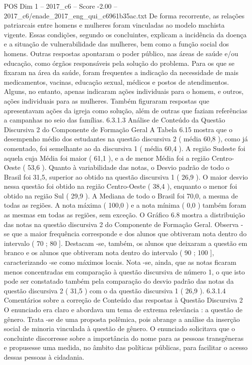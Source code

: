 \begin{textsample}{POS Dim 1 – 2017\_c6 – Score -2.00 – 2017\_c6/enade\_2017\_eng\_qui\_c6961b35ac.txt}
De forma recorrente, as relações patriarcais entre homens e mulheres foram vinculadas ao modelo machista vigente.
Essas condições, segundo os concluintes, explicam a incidência da doença e a situação de vulnerabilidade das mulheres, bem como a função social dos homens.
Outras respostas apontaram o poder público, nas áreas de saúde e/ou educação, como órgãos responsáveis pela solução do problema.
Para os que se fixaram na área da saúde, foram frequentes a indicação da necessidade de mais medicamentos, vacinas, educação sexual, médicos e postos de atendimentos.
Alguns, no entanto, apenas indicaram ações individuais para o homem, e outros, ações individuais para as mulheres.
Também figuraram respostas que apresentavam ações da igreja como solução, além de outras que faziam referências a campanhas no seio das famílias. 6.3.1.3 Análise de Conteúdo da Questão Discursiva 2 do Componente de Formação Geral A Tabela 6.15 mostra que o desempenho médio dos estudantes na questão discursiva 2 ( média 60,8 ), como já comentado, foi semelhante ao da discursiva 1 ( média 60,4 ).
A região Sudeste foi aquela cuja Média foi maior ( 61,1 ), e a de menor Média foi a região Centro-Oeste ( 53,6 ).
Quanto à variabilidade das notas, o Desvio padrão de todo o Brasil foi 31,5, superior ao obtido na questão discursiva 1 ( 26,9 ).
O maior desvio nessa questão foi obtido na região Centro-Oeste ( 38,4 ), enquanto o menor foi obtido na região Sul ( 29,9 ).
A Mediana de todo o Brasil foi 70,0, a mesma de todas as regiões.
A nota máxima ( 100,0 ) e a nota mínima ( 0,0 ) também foram as mesmas em todas as regiões, sem exceção.
O Gráfico 6.8 mostra a distribuição das notas na questão discursiva 2 do Componente de Formação Geral.
Observa -se que a maior frequência corresponde e dos alunos que obtiveram nota dentro do intervalo ( 70 ; 80 ].
Destacam -se, também, os alunos que deixaram a questão em branco e os alunos que obtiveram nota dentro do intervalo ( 90 ; 100 ], caracterizando -se como máximos locais.
Nota -se, ainda, que as notas ficaram menos concentradas em comparação à questão discursiva de número 1, o que isto pode ser constatado também pela comparação do desvio padrão das notas da questão discursiva 2 ( 31,5 ) com o da questão discursiva 1 ( 26,9 ). 6.3.1.4 Comentários sobre a correção de Conteúdo das respostas à Questão Discursiva 2 O enunciado era claro e abordava um tema de extrema relevância : a questão de gênero.
Trata -se de uma proposta polêmica, pois abrange a análise da inserção social de minoria vinculada à questão de gênero.
O enunciado solicitava que o concluinte discorresse sobre a importância do nome para as pessoas transgêneras e propusesse uma medida, no âmbito das políticas públicas, para facilitar o acesso dessas pessoas à cidadania.

\end{textsample}
